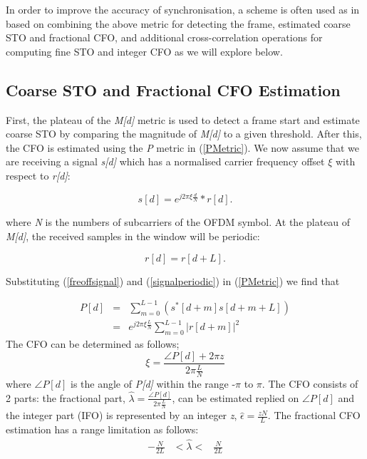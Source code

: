 In order to improve the accuracy of synchronisation, a scheme is often used as in \cite{Schwoerer2002,Manavi2004,Guffey2007,Huang2010,Recio2010} based on combining the above metric for detecting the frame, estimated coarse STO and fractional CFO, and additional cross-correlation operations for computing fine STO and integer CFO as we will explore below.

\subsection{Coarse STO and Fractional CFO Estimation}

First, the plateau of the \emph{M[d]} metric is used to detect a frame start and estimate coarse STO by comparing the magnitude of \emph{M[d]} to a given threshold. After this, the CFO is estimated using the \emph{P} metric in (\ref{PMetric}).
We now assume that we are receiving a signal \emph{s[d]} which has a normalised carrier frequency offset $\xi$ with respect to \emph{r[d]}:
\begin{center}
\begin{equation}
\label{freoffsignal}
s[d] =  e^{j2\pi\xi \frac{d}{N}}*r[d].
\end{equation}
\end{center}
where \emph{N} is the numbers of subcarriers of the OFDM symbol. At the plateau of \emph{M[d]}, the received samples in the window will be periodic:
\begin{center}
\begin{equation}
\label{signalperiodic}
r[d] =  r[d+L].
\end{equation}
\end{center}

Substituting (\ref{freoffsignal}) and  (\ref{signalperiodic}) in (\ref{PMetric}) we find that

\begin{eqnarray}
\label{PMetricfreoffset}
P[d] &=& \sum_{m =0}^{L-1}  (s^{*}[d+m] s[d+m+L] ) \nonumber \\
 &=& e^{j2\pi \xi \frac{L}{N}} \sum_{m =0}^{L-1}  |r[d+m]|^2
\end{eqnarray}
The CFO can be determined as follows;
\begin{equation}
\label{fractionalCFO}
\xi = \frac{\angle P[d] + 2\pi z}{2\pi \frac{L}{N}}
\end{equation}
where  $\angle P[d]$ is the angle of \emph{P[d]} within the range -$\pi$ to $\pi$.
The CFO consists of 2 parts: the fractional part, $\hat{\lambda} = \frac{\angle P[d]}{2\pi \frac{L}{N}}$, can be estimated replied on $\angle P[d]$ and the integer part (IFO) is represented by an integer \emph{z}, $\hat{\epsilon} = \frac{z N}{L}$.
The fractional CFO estimation has a range limitation as follows:
\begin{eqnarray}
\label{fractionalCFOlimitation}
 -\frac{N}{2L} & <  \hat{\lambda}   < & \frac{N}{2L}
\end{eqnarray}

